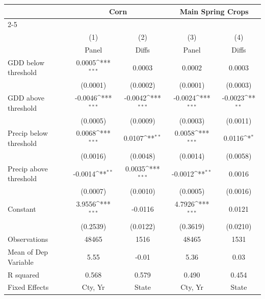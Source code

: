 {
\def\sym#1{\ifmmode^{#1}\else\(^{#1}\)\fi}
\begin{tabular*}{\hsize}{@{\hskip\tabcolsep\extracolsep\fill}l*{4}{c}}
\hline\hline
                &\multicolumn{2}{c}{Corn} & \multicolumn{2}{c}{Main Spring Crops} \\ \cline{2-5}         &                  &                  &                  \\
                &\multicolumn{1}{c}{(1)}&\multicolumn{1}{c}{(2)}&\multicolumn{1}{c}{(3)}&\multicolumn{1}{c}{(4)}\\
                &\multicolumn{1}{c}{Panel}&\multicolumn{1}{c}{Diffs}&\multicolumn{1}{c}{Panel}&\multicolumn{1}{c}{Diffs}\\
\hline
GDD below threshold&   0.0005\sym{***}&   0.0003         &   0.0002         &   0.0003         \\
                & (0.0001)         & (0.0002)         & (0.0001)         & (0.0003)         \\
[1em]
GDD above threshold&  -0.0046\sym{***}&  -0.0042\sym{***}&  -0.0024\sym{***}&  -0.0023\sym{**} \\
                & (0.0005)         & (0.0009)         & (0.0003)         & (0.0011)         \\
[1em]
Precip below threshold&   0.0068\sym{***}&   0.0107\sym{**} &   0.0058\sym{***}&   0.0116\sym{*}  \\
                & (0.0016)         & (0.0048)         & (0.0014)         & (0.0058)         \\
[1em]
Precip above threshold&  -0.0014\sym{**} &   0.0035\sym{***}&  -0.0012\sym{**} &   0.0016         \\
                & (0.0007)         & (0.0010)         & (0.0005)         & (0.0016)         \\
[1em]
Constant        &   3.9556\sym{***}&  -0.0116         &   4.7926\sym{***}&   0.0121         \\
                & (0.2539)         & (0.0122)         & (0.3619)         & (0.0210)         \\
\hline
Observations    &    48465         &     1516         &    48465         &     1531         \\
Mean of Dep Variable&     5.55         &    -0.01         &     5.36         &     0.03         \\
R squared       &    0.568         &    0.579         &    0.490         &    0.454         \\
Fixed Effects   &  Cty, Yr         &    State         &  Cty, Yr         &    State         \\
\hline\hline
\end{tabular*}
}
